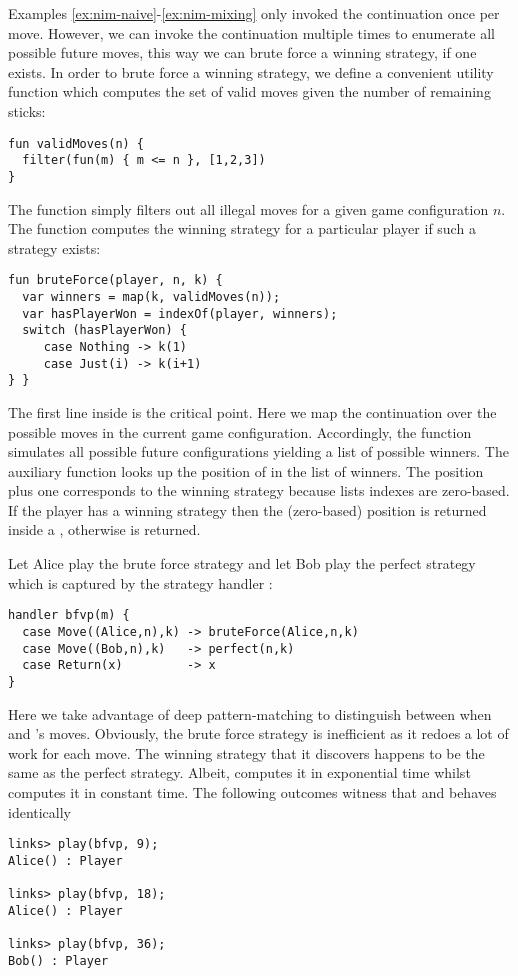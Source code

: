 \begin{example}\label{ex:nim-brute-force}
Examples \ref{ex:nim-naive}-\ref{ex:nim-mixing} only invoked the continuation once per move. However, we can invoke the continuation multiple times to enumerate all possible future moves, this way we can brute force a winning strategy, if one exists. In order to brute force a winning strategy, we define a convenient utility function which computes the set of valid moves given the number of remaining sticks:
\begin{lstlisting}[style=links]
fun validMoves(n) {
  filter(fun(m) { m <= n }, [1,2,3])
}
\end{lstlisting}
The function simply filters out all illegal moves for a given game configuration $n$.
The function  computes the winning strategy for a particular player if such a strategy exists:
\begin{lstlisting}[style=links]
fun bruteForce(player, n, k) {
  var winners = map(k, validMoves(n));
  var hasPlayerWon = indexOf(player, winners);
  switch (hasPlayerWon) {
     case Nothing -> k(1)
     case Just(i) -> k(i+1)
} }
\end{lstlisting}
The first line inside  is the critical point. Here we map the continuation  over the possible moves in the current game configuration. Accordingly, the function simulates all possible future configurations yielding a list of possible winners. The auxiliary function  looks up the position of  in the list of winners. The position plus one corresponds to the winning strategy because lists indexes are zero-based. If the player has a winning strategy then the (zero-based) position is returned inside a , otherwise  is returned.

Let Alice play the brute force strategy and let Bob play the perfect strategy which is captured by the strategy handler :
\begin{lstlisting}[style=links]
handler bfvp(m) {
  case Move((Alice,n),k) -> bruteForce(Alice,n,k)
  case Move((Bob,n),k)   -> perfect(n,k)
  case Return(x)         -> x
}
\end{lstlisting}
Here we take advantage of deep pattern-matching to distinguish between when  and 's moves. Obviously, the brute force strategy is inefficient as it redoes a lot of work for each move. The winning strategy that it discovers happens to be the same as the perfect strategy. Albeit,  computes it in exponential time whilst  computes it in constant time. The following outcomes witness that  and  behaves identically
\begin{lstlisting}[style=links]
links> play(bfvp, 9);
Alice() : Player

links> play(bfvp, 18);
Alice() : Player

links> play(bfvp, 36);
Bob() : Player
\end{lstlisting}
\end{example}
